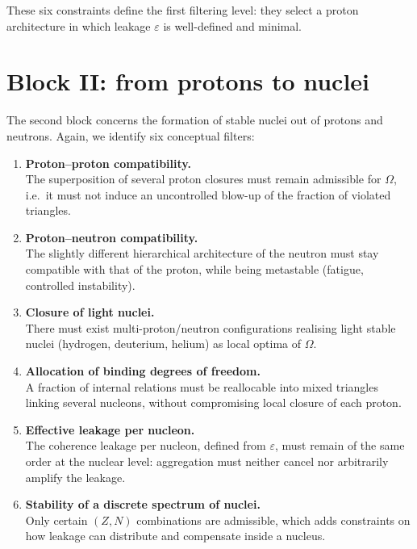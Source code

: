 \documentclass[11pt,a4paper]{article}
\begin{document}
These six constraints define the first filtering level: they select a proton
architecture in which leakage $\varepsilon$ is well-defined and minimal.

\section{Block II: from protons to nuclei}
\label{sec:blockII}

The second block concerns the formation of stable nuclei out of protons and
neutrons. Again, we identify six conceptual filters:

\begin{enumerate}
  \item \textbf{Proton--proton compatibility.} \\
  The superposition of several proton closures must remain admissible for
  $\Omega$, i.e.\ it must not induce an uncontrolled blow-up of the fraction
  of violated triangles.

  \item \textbf{Proton--neutron compatibility.} \\
  The slightly different hierarchical architecture of the neutron must stay
  compatible with that of the proton, while being metastable (fatigue,
  controlled instability).

  \item \textbf{Closure of light nuclei.} \\
  There must exist multi-proton/neutron configurations realising light
  stable nuclei (hydrogen, deuterium, helium) as local optima of $\Omega$.

  \item \textbf{Allocation of binding degrees of freedom.} \\
  A fraction of internal relations must be reallocable into mixed triangles
  linking several nucleons, without compromising local closure of each proton.

  \item \textbf{Effective leakage per nucleon.} \\
  The coherence leakage per nucleon, defined from $\varepsilon$, must remain
  of the same order at the nuclear level: aggregation must neither cancel
  nor arbitrarily amplify the leakage.

  \item \textbf{Stability of a discrete spectrum of nuclei.} \\
  Only certain $(Z,N)$ combinations are admissible, which adds constraints
  on how leakage can distribute and compensate inside a nucleus.
\end{enumerate}
\end{document}
